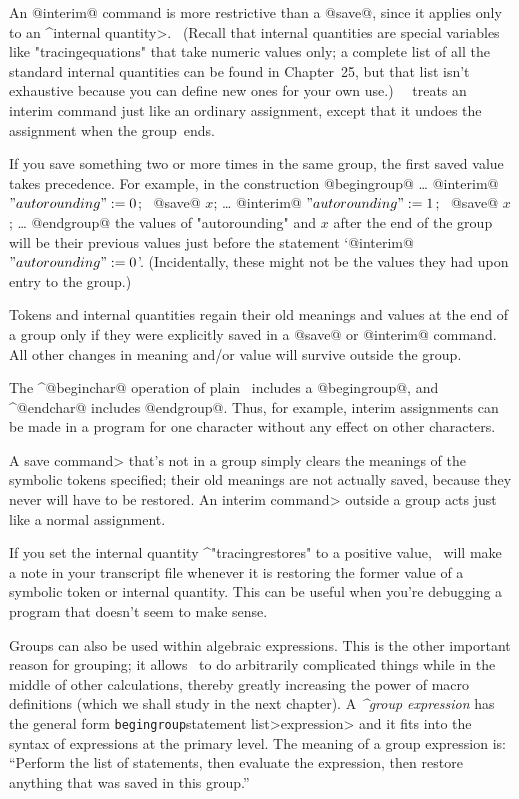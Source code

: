 {{{{\danger An @interim@ command is more restrictive than a @save@, since it
applies only to an ^\<internal quantity>. \ (Recall that internal
quantities are special variables like "tracingequations" that take numeric
values only; a complete list of all the standard internal quantities can
be found in Chapter~25, but that list isn't exhaustive because you can
define new ones for your own use.) \ \MF\ treats an interim command just
like an ordinary assignment, except that it undoes the assignment when the
group~ends.

\danger If you save something two or more times in the same group,
the first saved value takes precedence. For example, in the construction
\begindisplay
@begingroup@\cr
\noalign{\vskip-3pt}\dots\cr
@interim@ $"autorounding":=0$; \ @save@ $x$;\cr
\noalign{\vskip-3pt}\dots\cr
@interim@ $"autorounding":=1$; \ @save@ $x$;\cr
\noalign{\vskip-3pt}\dots\cr
@endgroup@\cr
\enddisplay
the values of "autorounding" and $x$ after the end of the group will be
their previous values just before the statement `@interim@ $"autorounding":=0$'.
(Incidentally, these might not be the values they had upon entry to the group.)

\danger Tokens and internal quantities regain their old meanings and
values at the end of a group only if they were explicitly saved in a
@save@ or @interim@ command. All other changes in meaning and/or value
will survive outside the group.

\danger The ^@beginchar@ operation of plain \MF\ includes a @begingroup@,
and ^@endchar@ includes @endgroup@. Thus, for example, interim assignments
can be made in a program for one character without any effect on other
characters.

\danger A \<save command> that's not in a group simply clears the meanings
of the symbolic tokens specified; their old meanings are not actually saved,
because they never will have to be restored. An \<interim command>
outside a group acts just like a normal assignment.

\danger If you set the internal quantity ^"tracingrestores" to a positive
value, \MF\ will make a note in your transcript file whenever it is
restoring the former value of a symbolic token or internal quantity.
This can be useful when you're debugging a program that doesn't seem
to make sense.

Groups can also be used within algebraic expressions. This is
the other important reason for grouping; it allows \MF\ to do arbitrarily
complicated things while in the middle of other calculations, thereby
greatly increasing the power of macro definitions (which we shall study
in the next chapter). A {\sl^{group expression}\/} has the general form
\begindisplay
{\tt begingroup}\thinspace\<statement list>\thinspace\<expression>%
\enddisplay
and it fits into the syntax of expressions at the primary level. The
meaning of a group expression is: ``Perform the list of statements,
then evaluate the expression, then restore anything that was saved
in this group.''

}}}}
